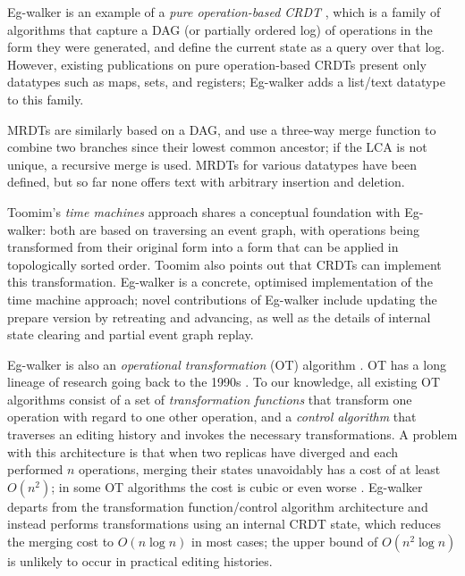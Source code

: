 \documentclass[sigplan,10pt]{acmart}
\newcommand{\algname}{Eg-walker\xspace}
\begin{document}
\algname is an example of a \emph{pure operation-based CRDT} \cite{polog}, which is a family of algorithms that capture a DAG (or partially ordered log) of operations in the form they were generated, and define the current state as a query over that log.
However, existing publications on pure operation-based CRDTs \cite{Almeida2023,Bauwens2023} present only datatypes such as maps, sets, and registers; \algname adds a list/text datatype to this family.

MRDTs \cite{Soundarapandian2022} are similarly based on a DAG, and use a three-way merge function to combine two branches since their lowest common ancestor; if the LCA is not unique, a recursive merge is used.
MRDTs for various datatypes have been defined, but so far none offers text with arbitrary insertion and deletion.

Toomim's \emph{time machines} approach \cite{time-machines} shares a conceptual foundation with \algname: both are based on traversing an event graph, with operations being transformed from their original form into a form that can be applied in topologically sorted order.
Toomim also points out that CRDTs can implement this transformation.
\algname is a concrete, optimised implementation of the time machine approach; novel contributions of \algname include updating the prepare version by retreating and advancing, as well as the details of internal state clearing and partial event graph replay.

\algname is also an \emph{operational transformation} (OT) algorithm \cite{Ellis1989}. %
OT has a long lineage of research going back to the 1990s \cite{Nichols1995,Ressel1996,Sun1998}.
To our knowledge, all existing OT algorithms consist of a set of \emph{transformation functions} that transform one operation with regard to one other operation, and a \emph{control algorithm} that traverses an editing history and invokes the necessary transformations.
A problem with this architecture is that when two replicas have diverged and each performed $n$ operations, merging their states unavoidably has a cost of at least $O(n^2)$; in some OT algorithms the cost is cubic or even worse \cite{Li2006,Roh2011RGA,Sun2020OT}.
\algname departs from the transformation function/control algorithm architecture and instead performs transformations using an internal CRDT state, which reduces the merging cost to $O(n \log n)$ in most cases; the upper bound of $O(n^2 \log n)$ is unlikely to occur in practical editing histories.
\end{document}

